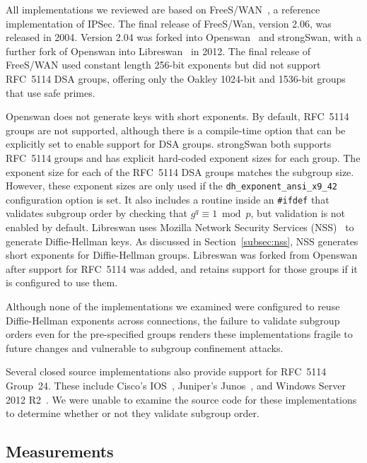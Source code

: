 All implementations we reviewed are based on FreeS/WAN~\cite{freeswan}, a
reference implementation of IPSec. The final release of FreeS/Wan, version
2.06, was released in 2004. Version 2.04 was forked into
Openswan~\cite{openswan} and strongSwan\cite{strongswan}, with a further fork
of Openswan into Libreswan~\cite{libreswan} in 2012.  The final release of
FreeS/WAN used constant length 256-bit exponents but did not support RFC~5114
DSA groups, offering only the Oakley 1024-bit and 1536-bit groups that use safe
primes.

\IKEGroupSupportAndValidationTable

Openswan does not generate keys with short exponents. By default, RFC~5114
groups are not supported, although there is a compile-time option that can be
explicitly set to enable support for DSA groups.  strongSwan both supports
RFC~5114 groups and has explicit hard-coded exponent sizes for each group. The
exponent size for each of the RFC~5114 DSA groups matches the subgroup size.
However, these exponent sizes are only used if the
\texttt{dh\_exponent\_ansi\_x9\_42} configuration option is set. It also
includes a routine inside an \texttt{\#ifdef} that validates subgroup order by
checking that $g^q \equiv 1 \bmod p$, but validation is not enabled by default.
Libreswan uses Mozilla Network Security Services (NSS)~\cite{nss-overview} to
generate Diffie-Hellman keys. As discussed in Section~\ref{subsec:nss}, NSS
generates short exponents for Diffie-Hellman groups. Libreswan was forked from
Openswan after support for RFC~5114 was added, and retains support for those
groups if it is configured to use them. 

Although none of the implementations we examined were configured to reuse
Diffie-Hellman exponents across connections, the failure to validate subgroup
orders even for the pre-specified groups renders these implementations fragile
to future changes and vulnerable to subgroup confinement attacks.

Several closed source implementations also provide support for RFC~5114
Group~24. These include Cisco's IOS~\cite{ciscogroup24}, Juniper's
Junos~\cite{junosgroup24}, and Windows Server 2012 R2~\cite{windowsgroup24}. We
were unable to examine the source code for these implementations to determine
whether or not they validate subgroup order.


\subsection{Measurements}

